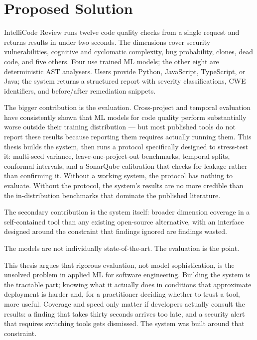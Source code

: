 \documentclass[12pt, oneside]{report}
\begin{document}
\section{Proposed Solution}
\label{sec:solution}

IntelliCode Review runs twelve code quality checks from a single request and returns results in under two seconds. The dimensions cover security vulnerabilities, cognitive and cyclomatic complexity, bug probability, clones, dead code, and five others. Four use trained ML models; the other eight are deterministic AST analysers. Users provide Python, JavaScript, TypeScript, or Java; the system returns a structured report with severity classifications, CWE identifiers, and before/after remediation snippets.

The bigger contribution is the evaluation. Cross-project and temporal evaluation have consistently shown that ML models for code quality perform substantially worse outside their training distribution — but most published tools do not report these results because reporting them requires actually running them. This thesis builds the system, then runs a protocol specifically designed to stress-test it: multi-seed variance, leave-one-project-out benchmarks, temporal splits, conformal intervals, and a SonarQube calibration that checks for leakage rather than confirming it. Without a working system, the protocol has nothing to evaluate. Without the protocol, the system's results are no more credible than the in-distribution benchmarks that dominate the published literature.

The secondary contribution is the system itself: broader dimension coverage in a
self-contained tool than any existing open-source alternative, with an interface
designed around the constraint that findings ignored are findings wasted.

The models are not individually state-of-the-art. The evaluation is the point.

This thesis argues that rigorous evaluation, not model sophistication, is the unsolved problem in applied ML for software engineering. Building the system is the tractable part; knowing what it actually does in conditions that approximate deployment is harder and, for a practitioner deciding whether to trust a tool, more useful. Coverage and speed only matter if developers actually consult the results: a finding that takes thirty seconds arrives too late, and a security alert that requires switching tools gets dismissed. The system was built around that constraint.
\end{document}
